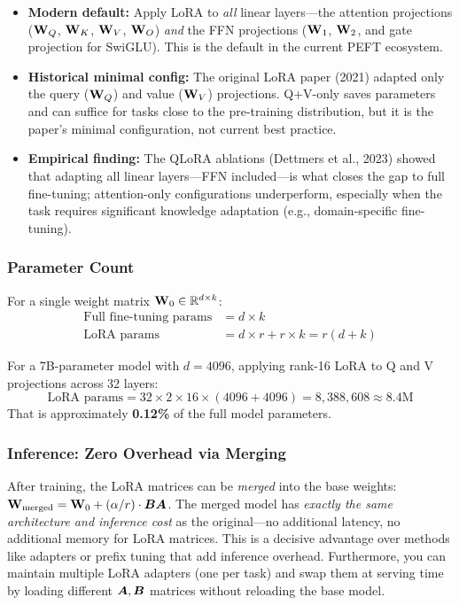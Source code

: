 \begin{itemize}
    \item \textbf{Modern default:} Apply LoRA to \emph{all} linear layers---the
          attention projections ($\mathbf{W}_Q$, $\mathbf{W}_K$, $\mathbf{W}_V$, $\mathbf{W}_O$) \emph{and}
          the FFN projections ($\mathbf{W}_1$, $\mathbf{W}_2$, and gate projection for
          SwiGLU).  This is the default in the current PEFT ecosystem.
    \item \textbf{Historical minimal config:} The original LoRA paper (2021)
          adapted only the query ($\mathbf{W}_Q$) and value ($\mathbf{W}_V$) projections.
          Q+V-only saves parameters and can suffice for tasks close to the
          pre-training distribution, but it is the paper's minimal
          configuration, not current best practice.
    \item \textbf{Empirical finding:} The QLoRA ablations (Dettmers et al.,
          2023) showed that adapting all linear layers---FFN included---is
          what closes the gap to full fine-tuning; attention-only
          configurations underperform, especially when the task requires
          significant knowledge adaptation (e.g., domain-specific fine-tuning).
\end{itemize}

\subsubsection{Parameter Count}

For a single weight matrix $\mathbf{W}_0 \in \mathbb{R}^{d \times k}$:
\begin{align*}
    \text{Full fine-tuning params} &= d \times k \\
    \text{LoRA params} &= d \times r + r \times k = r(d + k)
\end{align*}

For a 7B-parameter model with $d = 4096$, applying rank-16 LoRA to Q and V
projections across 32 layers:
\[
    \text{LoRA params} = 32 \times 2 \times 16 \times (4096 + 4096)
    = 8{,}388{,}608 \approx 8.4\text{M}
\]
That is approximately \textbf{0.12\%} of the full model parameters.

\subsubsection{Inference: Zero Overhead via Merging}

\begin{keyinsight}
After training, the LoRA matrices can be \emph{merged} into the base weights:
$\mathbf{W}_{\text{merged}} = \mathbf{W}_0 + (\alpha/r) \cdot \bm{B}\bm{A}$.  The merged model has
\emph{exactly the same architecture and inference cost} as the original---no
additional latency, no additional memory for LoRA matrices.  This is a
decisive advantage over methods like adapters or prefix tuning that add
inference overhead.  Furthermore, you can maintain multiple LoRA adapters
(one per task) and swap them at serving time by loading different $\bm{A}, \bm{B}$
matrices without reloading the base model.
\end{keyinsight}

